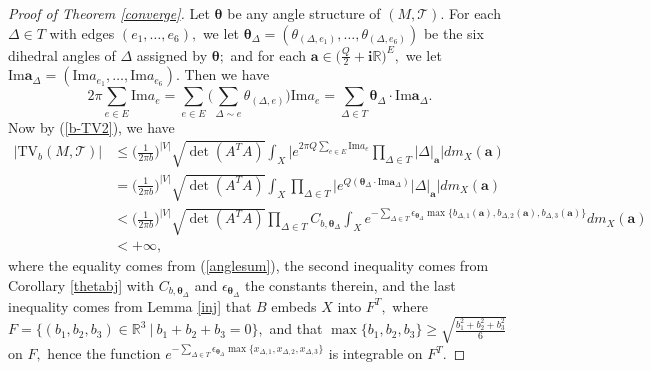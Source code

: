 \documentclass[11pt]{article}
\theoremstyle{remark}
\theoremstyle{remark}
\numberwithin{equation}{section}
\begin{document}
\begin{proof}[Proof of Theorem \ref{converge}]
Let $\boldsymbol \theta$ be any angle structure of $(M,\mathcal T).$ For each $\Delta\in T$ with edges $(e_1,\dots,e_6),$ we let $\boldsymbol \theta_\Delta=(\theta_{(\Delta,e_1)},\dots,\theta_{(\Delta,e_6)})$ be the six dihedral angles of $\Delta$ assigned by $\boldsymbol \theta;$ and for each $\boldsymbol a \in \big(\frac{Q}{2}+\mathbf i\mathbb R\big)^E,$ we let $\mathrm{Im}\boldsymbol a_\Delta =(\mathrm{Im}a_{e_1},\dots, \mathrm{Im}a_{e_6}).$ Then we have 
\begin{equation}\label{anglesum}
2\pi \sum_{e\in E} \mathrm{Im}a_e=\sum_{e\in E}\bigg(\sum_{\Delta\sim e}\theta_{(\Delta,e)}\bigg)\mathrm{Im}a_e  = \sum_{\Delta\in T} \boldsymbol \theta_\Delta\cdot  \mathrm{Im} \boldsymbol a_\Delta.
\end{equation}
Now by (\ref{b-TV2}), we have 
\begin{equation*}
\begin{split}
    \big|\mathrm{TV}_b( M,\mathcal T)\big| &
\leqslant \Big(\frac{1}{2\pi b}\Big)^{|V|}\sqrt{\det(A^TA)}\int_X \bigg| e^{2\pi Q\sum_{e\in E}\mathrm{Im}a_e} \prod_{\Delta\in T}|\Delta|_{\boldsymbol a}\bigg|dm_X(\boldsymbol a)\\
    &=\Big(\frac{1}{2\pi b}\Big)^{|V|}\sqrt{\det(A^TA)}\int_X \prod_{\Delta\in T}\bigg| e^{ Q(\boldsymbol \theta_\Delta\cdot \mathrm{Im}\boldsymbol a_\Delta)} |\Delta|_{\boldsymbol a}\bigg|dm_X(\boldsymbol a)\\
    &<\Big(\frac{1}{2\pi b}\Big)^{|V|}\sqrt{\det(A^TA)} \prod_{\Delta\in T} C_{b,\boldsymbol \theta_\Delta}\int_X  e^{-\sum_{\Delta\in T}\epsilon_{\boldsymbol \theta_\Delta}\max\big\{b_{\Delta,1}(\boldsymbol a),b_{\Delta,2}(\boldsymbol a),b_{\Delta,3}(\boldsymbol a)\big\}}dm_X(\boldsymbol a)\\
    &< +\infty,
\end{split}
\end{equation*}
where  the equality comes from (\ref{anglesum}), the second inequality comes from Corollary \ref{thetabj} with $C_{b,\boldsymbol \theta_\Delta}$ and $\epsilon_{\boldsymbol \theta_\Delta}$ the constants therein, and the last inequality comes from Lemma \ref{inj} that $B$ embeds $X$ into  $F^T,$ where  $F=\big\{(b_1,b_2,b_3)\in\mathbb R^3\ \big|\ b_1+b_2+b_3=0\big\},$ and that $\max\{b_1,b_2,b_3\}\geqslant \sqrt{\frac{b_1^2+b_2^2+b_3^2}{6}}$ on $F,$ hence
the function  $e^{-\sum_{\Delta\in T}\epsilon_{\boldsymbol \theta_\Delta}\max\{x_{\Delta,1},x_{\Delta,2},x_{\Delta,3}\}}$ is integrable on $F^T.$
\end{proof}
\end{document}
